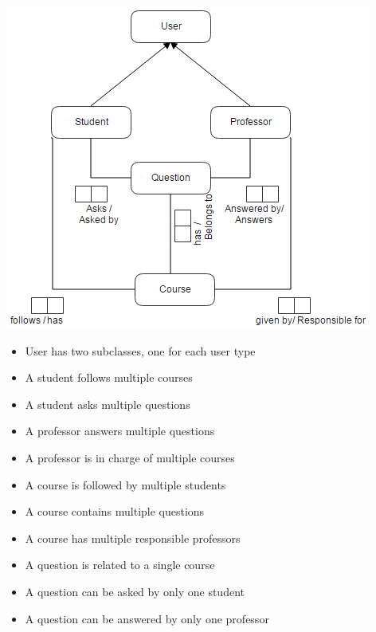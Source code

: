 \documentclass[10pt]{report}
\begin{document}
\begin{center}
	\includegraphics[scale=1]{img/orm.png}
\end{center}

\begin{itemize}
\item User has two subclasses, one for each user type
\item A student follows multiple courses
\item A student asks multiple questions
\item A professor answers multiple questions
\item A professor is in charge of multiple courses
\item A course is followed by multiple students
\item A course contains multiple questions
\item A course has multiple responsible professors
\item A question is related to a single course
\item A question can be asked by only one student
\item A question can be answered by only one professor

\end{itemize}
\end{document}
